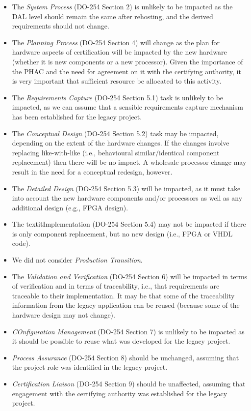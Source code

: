 \documentclass{llncs}
\begin{document}
\begin{itemize}
\item The \textit{System Process} (DO-254 Section 2) is unlikely to be impacted as the DAL level should remain the same after rehosting, and the derived requirements should
not change.

\item The \textit{Planning Process} (DO-254 Section 4) will change as the plan for hardware aspects of certification will be impacted by the new hardware (whether it is new components or a new processor). Given the importance of the PHAC and the need for agreement on it with the certifying authority, it is very important that sufficient resource be allocated to this activity.

\item The \textit{Requirements Capture} (DO-254 Section 5.1) task is unlikely to be impacted, as we can assume that a sensible requirements capture mechanism has been established for the legacy project.

\item The \textit{Conceptual Design} (DO-254 Section 5.2) task may be impacted, depending on the extent of the hardware changes. If the changes involve replacing like-with-like (i.e., behavioural similar/identical component replacement) then there will be no impact. A wholesale processor change may result in the need for a conceptual redesign, however.

\item The \textit{Detailed Design} (DO-254 Section 5.3) will be impacted, as it must take into account the new hardware components and/or processors as well as any additional design (e.g., FPGA design). 

\item The textit{Implementation} (DO-254 Section 5.4) may not be impacted if there is only component replacement, but no new design (i.e., FPGA or VHDL code).

\item We did not consider \textit{Production Transition}.

\item The \textit{Validation and Verification} (DO-254 Section 6) will be impacted in terms of verification and in terms of traceability, i.e., that requirements are traceable to their implementation. It may be that some of the traceability information from the legacy application can be reused (because some of the hardware design may not change).

\item \textit{COnfiguration Management} (DO-254 Section 7) is unlikely to be impacted as it should be possible to reuse what was developed for the legacy project.

\item \textit{Process Assurance} (DO-254 Section 8) should be unchanged, assuming that the project role was identified in the legacy project.

\item \textit{Certification Liaison} (DO-254 Section 9) should be unaffected, assuming that engagement with the certifying authority was established for the legacy project.
\end{itemize}
\end{document}
